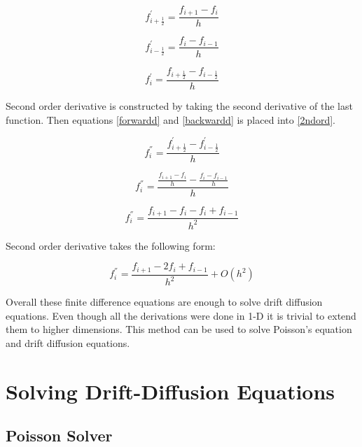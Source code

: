 \begin{equation}
f_{i+\frac{1}{2}}^{'}=\frac{f_{i+1}-f_{i}}{h}
\label{forwardd}
\end{equation}

\begin{equation}
f_{i-\frac{1}{2}}^{'}=\frac{f_{i}-f_{i-1}}{h}
\label{backwardd}
\end{equation}

\begin{equation}
f^{'}_{i}=\frac{f_{i+\frac{1}{2}}-f_{i-\frac{1}{2}}}{h}
\label{2ndord}
\end{equation}

Second order derivative is constructed by taking the second derivative of the last function. Then equations \ref{forwardd} and \ref{backwardd} is placed into \ref{2ndord}.

\begin{equation}\nonumber
f^{''}_{i}=\frac{f_{i+\frac{1}{2}}^{'}-f_{i-\frac{1}{2}}^{'}}{h}
\end{equation}

\begin{equation}\nonumber
f^{''}_{i}=\frac{\frac{f_{i+1}-f_{i}}{h}-\frac{f_{i}-f_{i-1}}{h}}{h}
\end{equation}

\begin{equation}\nonumber
f^{''}_{i}=\frac{f_{i+1}-f_{i}-f_{i}+f_{i-1}}{h^2}
\end{equation}

Second order derivative takes the following form:

\begin{equation}
f^{''}_{i}=\frac{f_{i+1}-2f_{i}+f_{i-1}}{h^2}+O(h^2)
\label{fdc2}
\end{equation}

Overall these finite difference equations are enough to solve drift diffusion equations. Even though all the derivations were done in 1-D it is trivial to extend them to higher dimensions. This method can be used to solve Poisson's equation and drift diffusion equations.

\clearpage
\section{Solving Drift-Diffusion Equations}
\subsection{Poisson Solver}

